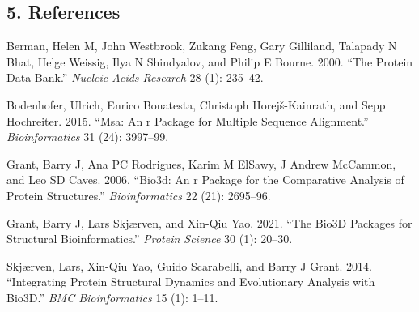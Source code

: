 \documentclass[
]{article}
\newlength{\cslhangindent}
\newlength{\cslentryspacingunit} %
\newenvironment{CSLReferences}[2] %
 {%
  \setlength{\parindent}{0pt}
  \ifodd #1
  \let\oldpar\par
  \def\par{\hangindent=\cslhangindent\oldpar}
  \fi
  \setlength{\parskip}{#2\cslentryspacingunit}
 }%
 {}
\begin{document}
\hypertarget{references}{%
\subsection*{5. References}\label{references}}

\hypertarget{refs}{}
\begin{CSLReferences}{1}{0}
\leavevmode{}%
Berman, Helen M, John Westbrook, Zukang Feng, Gary Gilliland, Talapady N
Bhat, Helge Weissig, Ilya N Shindyalov, and Philip E Bourne. 2000.
{``The Protein Data Bank.''} \emph{Nucleic Acids Research} 28 (1):
235--42.

\leavevmode{}%
Bodenhofer, Ulrich, Enrico Bonatesta, Christoph Horejš-Kainrath, and
Sepp Hochreiter. 2015. {``Msa: An r Package for Multiple Sequence
Alignment.''} \emph{Bioinformatics} 31 (24): 3997--99.

\leavevmode{}%
Grant, Barry J, Ana PC Rodrigues, Karim M ElSawy, J Andrew McCammon, and
Leo SD Caves. 2006. {``Bio3d: An r Package for the Comparative Analysis
of Protein Structures.''} \emph{Bioinformatics} 22 (21): 2695--96.

\leavevmode{}%
Grant, Barry J, Lars Skjærven, and Xin-Qiu Yao. 2021. {``The Bio3D
Packages for Structural Bioinformatics.''} \emph{Protein Science} 30
(1): 20--30.

\leavevmode{}%
Skjærven, Lars, Xin-Qiu Yao, Guido Scarabelli, and Barry J Grant. 2014.
{``Integrating Protein Structural Dynamics and Evolutionary Analysis
with Bio3D.''} \emph{BMC Bioinformatics} 15 (1): 1--11.

\end{CSLReferences}
\end{document}
